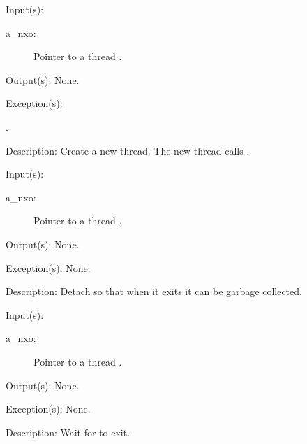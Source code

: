 \begin{capi}
\begin{capilist}
	\item[Input(s): ]
		\begin{description}\item[]
		\item[a\_nxo: ]
			Pointer to a thread .
		\end{description}
	\item[Output(s): ] None.
	\item[Exception(s): ]
		\begin{description}\item[]
		\item[.]
		\end{description}
	\item[Description: ]
		Create a new thread.  The new thread calls
		.
	\end{capilist}
\label{nxo_thread_}
	\begin{capilist}
	\item[Input(s): ]
		\begin{description}\item[]
		\item[a\_nxo: ]
			Pointer to a thread .
		\end{description}
	\item[Output(s): ] None.
	\item[Exception(s): ] None.
	\item[Description: ]
		Detach  so that when it exits it can be garbage
		collected.
	\end{capilist}
\label{nxo_thread_join}
	\begin{capilist}
	\item[Input(s): ]
		\begin{description}\item[]
		\item[a\_nxo: ]
			Pointer to a thread \classname{nxo}.
		\end{description}
	\item[Output(s): ] None.
	\item[Exception(s): ] None.
	\item[Description: ]
		Wait for  to exit.
	\end{capilist}
\label{nxo_thread_state}

\end{capi}
